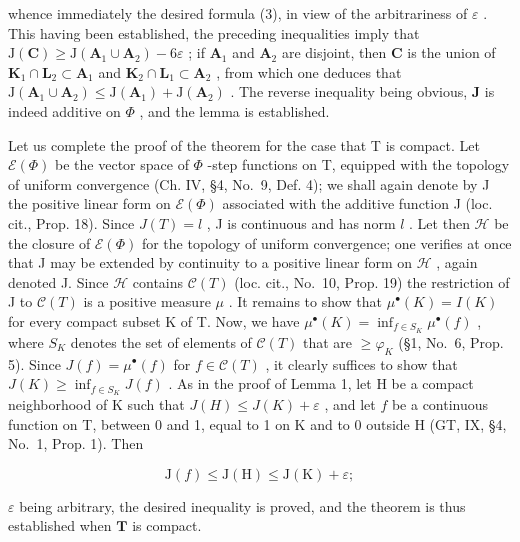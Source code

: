 whence immediately the desired formula (3), in view of the arbitrariness of \(\varepsilon\) . This having been established, the preceding inequalities imply that \(\mathrm{J}(\mathbf{C}) \geqslant \mathrm{J}(\mathbf{A}_1 \cup \mathbf{A}_2) - 6\varepsilon\) ; if \(\mathbf{A}_1\) and \(\mathbf{A}_2\) are disjoint, then \(\mathbf{C}\) is the union of \(\mathbf{K}_1 \cap \mathbf{L}_2 \subset \mathbf{A}_1\) and \(\mathbf{K}_2 \cap \mathbf{L}_1 \subset \mathbf{A}_2\) , from which one deduces that \(\mathrm{J}(\mathbf{A}_1 \cup \mathbf{A}_2) \leqslant \mathrm{J}(\mathbf{A}_1) + \mathrm{J}(\mathbf{A}_2)\) . The reverse inequality being obvious, \(\mathbf{J}\) is indeed additive on \(\Phi\) , and the lemma is established.

Let us complete the proof of the theorem for the case that T is compact. Let \(\mathcal{E}(\Phi)\) be the vector space of \(\Phi\) -step functions on T, equipped with the topology of uniform convergence (Ch. IV, §4, No.~9, Def. 4); we shall again denote by J the positive linear form on \(\mathcal{E}(\Phi)\) associated with the additive function J (loc. cit., Prop. 18). Since \(J(T) = l\) , J is continuous and has norm \(l\) . Let then \(\mathcal{H}\) be the closure of \(\mathcal{E}(\Phi)\) for the topology of uniform convergence; one verifies at once that J may be extended by continuity to a positive linear form on \(\mathcal{H}\) , again denoted J. Since \(\mathcal{H}\) contains \(\mathcal{C}(T)\) (loc. cit., No.~10, Prop. 19) the restriction of J to \(\mathcal{C}(T)\) is a positive measure \(\mu\) . It remains to show that \(\mu^{\bullet}(K) = I(K)\) for every compact subset K of T. Now, we have \(\mu^{\bullet}(K) = \inf_{f \in S_K} \mu^{\bullet}(f)\) , where \(S_K\) denotes the set of elements of \(\mathcal{C}(T)\) that are \(\geqslant \varphi_K\) (§1, No.~6, Prop. 5). Since \(J(f) = \mu^{\bullet}(f)\) for \(f \in \mathcal{C}(T)\) , it clearly suffices to show that \(J(K) \geqslant \inf_{f \in S_K} J(f)\) . As in the proof of Lemma 1, let H be a compact neighborhood of K such that \(J(H) \leqslant J(K) + \varepsilon\) , and let \(f\) be a continuous function on T, between 0 and 1, equal to 1 on K and to 0 outside H (GT, IX, §4, No.~1, Prop. 1). Then

\[
\mathrm{J} (f) \leqslant \mathrm{J} (\mathrm{H}) \leqslant \mathrm{J} (\mathrm{K}) + \varepsilon ;
\]

\(\varepsilon\) being arbitrary, the desired inequality is proved, and the theorem is thus established when \(\mathbf{T}\) is compact.

